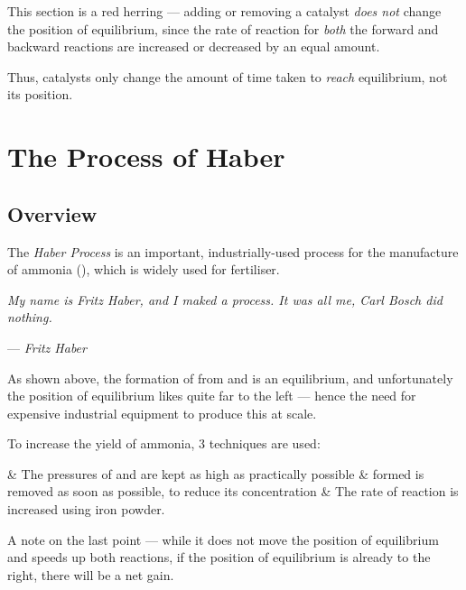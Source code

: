 			This section is a red herring --- adding or removing a catalyst \textit{does not} change the position of equilibrium, since the
			rate of reaction for \textit{both} the forward and backward reactions are increased or decreased by an equal amount.

			Thus, catalysts only change the amount of time taken to \textit{reach} equilibrium, not its position.




	\pagebreak
	\section{The Process of Haber}

		\subsection{Overview}

			The \textit{Haber Process} is an important, industrially-used process for the manufacture of ammonia (), which is widely
			used for fertiliser.

			\textit{My name is Fritz Haber, and I maked a process. It was all me, Carl Bosch did nothing.}

			--- \textit{Fritz Haber}

			As shown above, the formation of  from  and  is an equilibrium, and unfortunately the position of equilibrium
			likes quite far to the left --- hence the need for expensive industrial equipment to produce this at scale.




			To increase the yield of ammonia, 3 techniques are used:


			\begin{bulletlist}
				& The pressures of  and  are kept as high as practically possible
				&  formed is removed as soon as possible, to reduce its concentration
				& The rate of reaction is increased using iron powder.
			\end{bulletlist}

			A note on the last point --- while it does not move the position of equilibrium and speeds up both reactions, if the
			position of equilibrium is already to the right, there will be a net gain.

